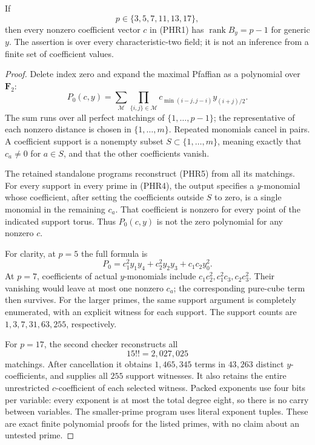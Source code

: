 \begin{proposition}
\label{prop:prime-Heisenberg-dual-rank-through-seventeen}
If
\[
                     p\in\{3,5,7,11,13,17\},
                                                        \tag{PHR4}
\]
then every nonzero coefficient vector \(c\) in (PHR1) has
\(\operatorname{rank}B_y=p-1\) for generic \(y\).
The assertion is over every characteristic-two field; it is
not an inference from a finite set of coefficient values.
\end{proposition}
\begin{proof}
Delete index zero and expand the maximal Pfaffian as a polynomial
over \(\mathbf F_2\):
\[
 P_0(c,y)=
 \sum_{\mathcal M}
 \prod_{\{i,j\}\in\mathcal M}
       c_{\min(i-j,j-i)}y_{(i+j)/2}.             \tag{PHR5}
\]
The sum runs over all perfect matchings of
\(\{1,\ldots,p-1\}\); the representative of each nonzero
distance is chosen in \(\{1,\ldots,m\}\). Repeated monomials
cancel in pairs. A coefficient support is a nonempty subset
\(S\subset\{1,\ldots,m\}\), meaning exactly that \(c_a\ne0\)
for \(a\in S\), and that the other coefficients vanish.

The retained standalone programs reconstruct (PHR5) from all its
matchings. For every support in every prime in (PHR4), the output
specifies a \(y\)-monomial whose coefficient, after setting the
coefficients outside \(S\) to zero, is a single monomial in the
remaining \(c_a\). That coefficient is nonzero for every point
of the indicated support torus. Thus \(P_0(c,y)\) is not the
zero polynomial for any nonzero \(c\).

For clarity, at \(p=5\) the full formula is
\[
 P_0=c_1^2y_1y_4+c_2^2y_2y_3+c_1c_2y_0^2.
                                                        \tag{PHR6}
\]
At \(p=7\), coefficients of actual \(y\)-monomials include
\(c_1c_2^2,c_1^2c_3,c_2c_3^2\). Their vanishing would leave
at most one nonzero \(c_a\); the corresponding pure-cube term
then survives. For the larger primes, the same support argument
is completely enumerated, with an explicit witness for each support.
The support counts are \(1,3,7,31,63,255\), respectively.

For \(p=17\), the second checker reconstructs all
\[
                 15!!=2{,}027{,}025
\]
matchings. After cancellation it obtains \(1{,}465{,}345\)
terms in \(43{,}263\) distinct \(y\)-coefficients, and supplies
all \(255\) support witnesses. It also retains the entire
unrestricted \(c\)-coefficient of each selected witness.
Packed exponents use four bits per variable: every exponent is
at most the total degree eight, so there is no carry between
variables. The smaller-prime program uses literal exponent tuples.
These are exact finite polynomial proofs for the listed primes,
with no claim about an untested prime.
\end{proof}

